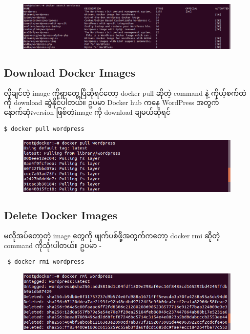 \documentclass{article}
\begin{document}
\begin{figure}[htbp]
\centering
\includegraphics[width=0.70\paperwidth]{.gitbook/assets/2_search-large-resolution.png}
\end{figure}

\subsection{Download Docker Images}\label{download-docker-images}

လိုချင်တဲ့ image ကိုရှာတွေ့ပြီဆိုရင်တော့ docker pull ဆိုတဲ့ command နဲ့
ကိုယ့်စက်ထဲကို download ဆွဲနိုင်ပါတယ်။ ဥပမာ Docker hub ကနေ WordPress
အတွက်နောက်ဆုံးversion ဖြစ်တဲ့image ကို download ချမယ်ဆိုရင်

\begin{verbatim}
$ docker pull wordpress
\end{verbatim}

\begin{figure}[htbp]
\centering
\includegraphics[width=0.70\paperwidth]{.gitbook/assets/3_pull_wordpress.png}
\end{figure}

\subsection{Delete Docker Images}\label{delete-docker-images}

မလိုအပ်တော့တဲ့ image တွေကို ဖျက်ပစ်ဖို့အတွက်ကတော့ docker rmi ဆိုတဲ့
command ကိုသုံးပါတယ်။ ဥပမာ -

\begin{verbatim}
 $ docker rmi wordpress
\end{verbatim}

\begin{figure}[htbp]
\centering
\includegraphics[width=0.70\paperwidth]{.gitbook/assets/4_rmi.png}
\end{figure}
\end{document}
